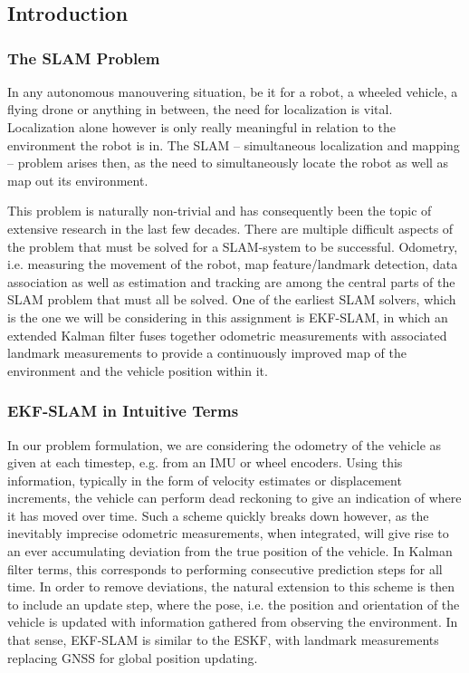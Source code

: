 \section{}
\subsection{Introduction}
\subsubsection{The SLAM Problem}
In any autonomous manouvering situation, be it for a robot, a wheeled vehicle, a flying drone or anything in between, the need for localization is vital.
Localization alone however is only really meaningful in relation to the environment the robot is in.
The SLAM – simultaneous localization and mapping – problem arises then, as the need to simultaneously locate the robot as well as map out its environment.

This problem is naturally non-trivial and has consequently been the topic of extensive research in the last few decades.
There are multiple difficult aspects of the problem that must be solved for a SLAM-system to be successful.
Odometry, i.e. measuring the movement of the robot, map feature/landmark detection, data association as well as estimation and tracking are among the central parts of the SLAM problem that must all be solved.
One of the earliest SLAM solvers, which is the one we will be considering in this assignment is EKF-SLAM, in which an extended Kalman filter fuses together odometric measurements with associated landmark measurements to provide a continuously improved map of the environment and the vehicle position within it.

\subsubsection{EKF-SLAM in Intuitive Terms}
In our problem formulation, we are considering the odometry of the vehicle as given at each timestep, e.g. from an IMU or wheel encoders.
Using this information, typically in the form of velocity estimates or displacement increments, the vehicle can perform dead reckoning to give an indication of where it has moved over time.
Such a scheme quickly breaks down however, as the inevitably imprecise odometric measurements, when integrated, will give rise to an ever accumulating deviation from the true position of the vehicle. In Kalman filter terms, this corresponds to performing consecutive prediction steps for all time. In order to remove deviations, the natural extension to this scheme is then to include an update step, where the pose, i.e. the position and orientation of the vehicle is updated with information gathered from observing the environment. In that sense, EKF-SLAM is similar to the ESKF, with landmark measurements replacing GNSS for global position updating.

